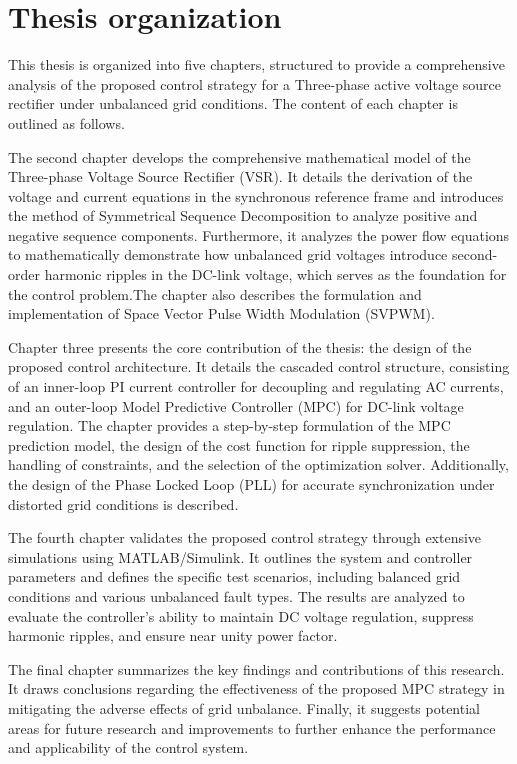 \section{Thesis organization}
This thesis is organized into five chapters, structured to provide a comprehensive analysis of the proposed control strategy for
a Three-phase active voltage source rectifier under unbalanced grid conditions. The content of each chapter is outlined as follows.\par
The second chapter develops the comprehensive mathematical model of the Three-phase Voltage Source Rectifier (VSR). It details the
derivation of the voltage and current equations in the synchronous reference frame and introduces the method of Symmetrical Sequence
Decomposition to analyze positive and negative sequence components. Furthermore, it analyzes the power flow equations to mathematically
demonstrate how unbalanced grid voltages introduce second-order harmonic ripples in the DC-link voltage, which serves as the foundation
for the control problem.The chapter also describes the formulation and implementation of Space Vector Pulse Width Modulation (SVPWM).\par
Chapter three presents the core contribution of the thesis: the design of the proposed control architecture. It details the cascaded
control structure, consisting of an inner-loop PI current controller for decoupling and regulating AC currents, and an outer-loop
Model Predictive Controller (MPC) for DC-link voltage regulation. The chapter provides a step-by-step formulation of the MPC prediction model,
the design of the cost function for ripple suppression, the handling of constraints, and the selection of the optimization solver.
Additionally, the design of the Phase Locked Loop (PLL) for accurate synchronization under distorted grid conditions is described.\par
The fourth chapter validates the proposed control strategy through extensive simulations using MATLAB/Simulink. It outlines the system 
and controller parameters and defines the specific test scenarios, including balanced grid conditions and various unbalanced fault types.
The results are analyzed to evaluate the controller's ability to maintain DC voltage regulation, suppress harmonic ripples, and
ensure near unity power factor.\par
The final chapter summarizes the key findings and contributions of this research. It draws conclusions regarding the effectiveness of the
proposed MPC strategy in mitigating the adverse effects of grid unbalance. Finally, it suggests potential areas for future research and
improvements to further enhance the performance and applicability of the control system.\par